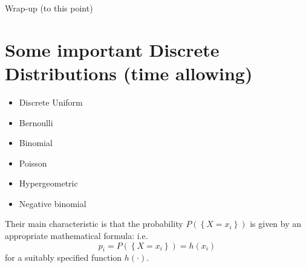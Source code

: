 \documentclass[smaller, handout]{beamer}\usepackage[]{graphicx}\usepackage[]{color}
\newenvironment{stepitemize}{\begin{itemize}[<+->]}{\end{itemize} }
\begin{document}
\begin{frame}{Wrap-up (to this point)}
\end{frame}



\section{Some important Discrete Distributions (time allowing)}

\begin{frame}{\secname}%


\begin{stepitemize}
\item Discrete Uniform
\vspace{0.15cm}
\item Bernoulli
\vspace{0.15cm}
\item Binomial
\vspace{0.15cm}
\item Poisson
\vspace{0.15cm}
\item Hypergeometric
\vspace{0.15cm}
\item Negative binomial
\end{stepitemize}

\vspace{0.5cm}
Their main characteristic is that the probability $P\left(\left\{ X=x_i\right\}\right)$ is given by an appropriate mathematical formula: i.e.
$$
p_{i}=P\left(\left\{ X=x_i\right\}\right)=h(x_{i})
$$
for a suitably specified function $h(\cdot)$.

\end{frame}%
\end{document}
